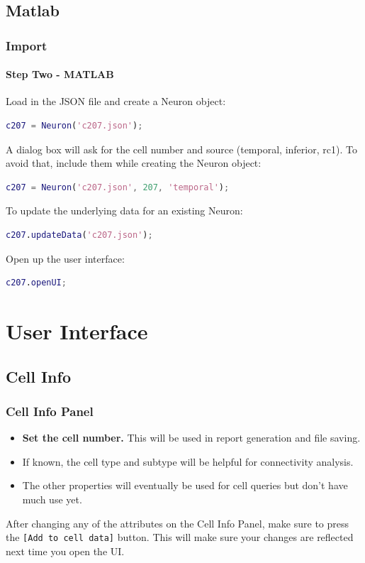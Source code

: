 \documentclass[11pt]{beamer}
\begin{document}
\subsection{Matlab}
\begin{frame}[fragile]
	\frametitle{Import}
	\framesubtitle{Step Two - MATLAB}
	Load in the JSON file and create a Neuron object:
	\begin{lstlisting}[language=matlab]
c207 = Neuron('c207.json');\end{lstlisting}
	A dialog box will ask for the cell number and source (temporal, inferior, rc1). To avoid that, include them while creating the Neuron object:
	\begin{lstlisting}[language=matlab]
% output = Neuron(filename, cellNumber, source);
c207 = Neuron('c207.json', 207, 'temporal');\end{lstlisting}
	To update the underlying data for an existing Neuron:
	\begin{lstlisting}[language=matlab]
c207.updateData('c207.json');\end{lstlisting}
	Open up the user interface:
	\begin{lstlisting}[language=matlab]
c207.openUI;\end{lstlisting}
\end{frame}
\section{User Interface}
\subsection{Cell Info}
	\begin{frame}
		\frametitle{Cell Info Panel}
		\begin{itemize}
			\item \textbf{Set the cell number.} This will be used in report generation and file saving. 
			\item If known, the cell type and subtype will be helpful for connectivity analysis.
			\item The other properties will eventually be used for cell queries but don't have much use yet.
		\end{itemize}
			After changing any of the attributes on the Cell Info Panel, make sure to press the \texttt{[Add to cell data]} button. This will make sure your changes are reflected next time you open the UI.\\
	\end{frame}
\end{document}
